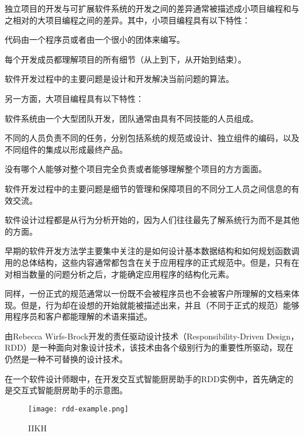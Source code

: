 独立项目的开发与可扩展软件系统的开发之间的差异通常被描述成小项目编程和与之相对的大项目编程之间的差异。其中，小项目编程具有以下特性：

\begin{compactenum}
\item 代码由一个程序员或者由一个很小的团体来编写。
\item 每个开发成员都理解项目的所有细节（从上到下，从开始到结束）。
\item 软件开发过程中的主要问题是设计和开发解决当前问题的算法。
\end{compactenum}

另一方面，大项目编程具有以下特性：

\begin{compactenum}
\item 软件系统由一个大型团队开发，团队通常由具有不同技能的人员组成。
\item 不同的人员负责不同的任务，分别包括系统的规范或设计、独立组件的编码，以及不同组件的集成以形成最终产品。
\item 没有哪个人能够对整个项目完全负责或者能够理解整个项目的方方面面。
\item 软件开发过程中的主要问题是细节的管理和保障项目的不同分工人员之间信息的有效交流。
\end{compactenum}

软件设计过程都是从行为分析开始的，因为人们往往最先了解系统行为而不是其他的方面。

早期的软件开发方法学主要集中关注的是如何设计基本数据结构和如何规划函数调用的总体结构，这些内容通常都包含在关于应用程序的正式规范中。但是，只有在对相当数量的问题分析之后，才能确定应用程序的结构化元素。

同样，一份正式的规范通常以一份既不会被程序员也不会被客户所理解的文档来体现。但是，行为却在设想的开始就能被描述出来，并且（不同于正式的规范）能够用程序员和客户都能理解的术语来描述。

由Rebecca Wirfs-Brock开发的责任驱动设计技术（Responsibility-Driven Design，RDD）是一种面向对象设计技术，该技术由各个级别行为的重要性所驱动，现在仍然是一种不可替换的设计技术。


在一个软件设计师眼中，在开发交互式智能厨房助手的RDD实例中，首先确定的是交互式智能厨房助手的示意图。

\begin{figure}[htbp]
\centering
\texttt{[image: rdd-example.png]}
\caption{IIKH}
\label{fig:iikh}
\end{figure}


